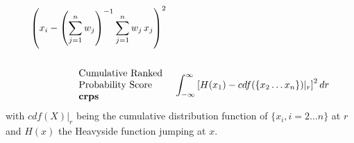 {{\begin{eqnarray*}
{  \left ( x_i - \left ( \sum_{j=1}^{n} w_j \right )^{-1} \sum\limits_{j=1}^{n} w_j \, x_j \right)^2 } \\
\\
\begin{array}{l}
\makebox[3cm][l]{Cumulative Ranked} \\
\makebox[3cm][l]{Probability Score} \\
\makebox[3cm][l]{{\bf crps}} \\
\end{array}
 &  &
\int_{-\infty}^{\infty} \left[ H(x_1) - cdf(\{x_2\ldots x_n\})|_{r} \right]^2 dr \\
\end{eqnarray*}
\hspace{1cm} with \(cdf(X)|_r\) being the cumulative distribution function of \(\{x_i,i=2\ldots n\}\) at \(r\)\\

\hspace{1cm} and \(H(x)\) the Heavyside function jumping at \(x\).

}}
